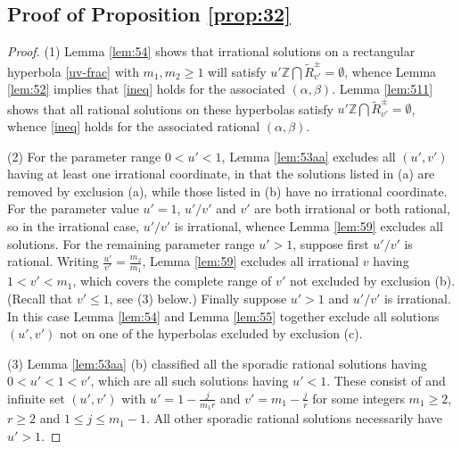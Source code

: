 \documentclass[12pt,letterpaper, reqno]{amsart}
\theoremstyle{definition}
\theoremstyle{remark}
\newcommand{\ZZ}{\ensuremath{\mathbb{Z}}}
\newcommand{\uu}{{u'}}
\newcommand{\vv}{{v'}}
\begin{document}
%
%
\subsection{Proof of Proposition \ref{prop:32} }\label{sec;56}


\begin{proof}
(1) Lemma \ref{lem:54} shows that irrational solutions on a rectangular hyperbola \eqref{uv-frac} with $m_1, m_2 \ge 1$
will satisfy ${\uu} \ZZ \bigcap \widetilde{R}_{\vv}^{\pm} = \emptyset$, whence Lemma \ref{lem:52} implies that
\eqref{ineq}  holds for the associated $(\alpha, \beta)$. 
 Lemma \ref{lem:511} shows that all rational solutions on these hyperbolas
 satisfy ${\uu} \ZZ \bigcap  \widetilde{R}_{\vv}^{\pm} = \emptyset$, whence \eqref{ineq} holds for the associated 
 rational $(\alpha, \beta)$.
 
 (2) For the parameter range $0 < {\uu} <1$, Lemma \ref{lem:53aa} excludes all $(\uu,\vv)$ having at least one irrational coordinate,
 in that the solutions listed in (a) are removed by exclusion (a), while those listed in (b) have no irrational coordinate. For the parameter
  value ${\uu}=1$,  $\uu/\vv$ and $\vv$ are both irrational or both rational, so in  the irrational case, $\uu/\vv$ is irrational, whence Lemma \ref{lem:59}
 excludes all solutions. For the remaining parameter range ${\uu} >1$, suppose first $\uu/\vv$ is rational. Writing $\frac\uu\vv= \frac{m_2}{m_1}$, 
 Lemma \ref{lem:59} excludes all irrational $v$ having $1 < \vv <m_1$,
 which covers the complete range of $\vv$  not excluded by exclusion (b). (Recall that $\vv \le 1$, see (3) below.) 
 Finally suppose ${\uu} >1$ and $\uu/\vv$ is irrational. In this case Lemma \ref{lem:54} 
 and Lemma \ref{lem:55} together exclude all solutions $(\uu, \vv)$ not on one of the hyperbolas excluded by exclusion (c).
 
 (3)  
Lemma \ref{lem:53aa} (b) classified all the sporadic rational solutions having $0< \uu <1< \vv$, which are all such solutions having ${\uu} <1$.
 These consist of  and infinite set $(\uu, \vv)$ with
 $\uu= 1-\frac{j}{m_1r}$ and  $\vv = m_1-\frac{j}{r}$ for some integers $ m_1 \ge 2$,  $r\geq 2$ and $1\le j\le m_1-1$.
All other sporadic rational solutions necessarily  have ${\uu} > 1$.
\end{proof}
\end{document}

